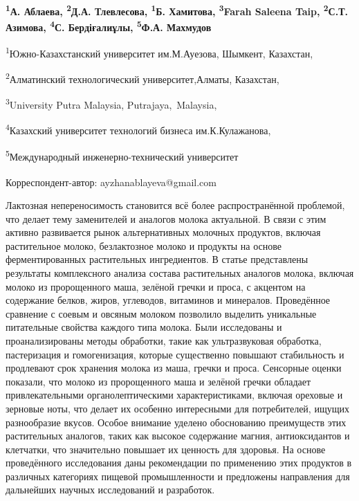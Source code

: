 
\begin{articleheader}

{\bfseries
\textsuperscript{1}А. Аблаева\textsuperscript{\envelope },
\textsuperscript{2}Д.А. Тлевлесова,
\textsuperscript{1}Б. Хамитова,
\textsuperscript{3}Farah Saleena Taip,
\textsuperscript{2}С.Т. Азимова,
\textsuperscript{4}С. Бердіғалиұлы,
\textsuperscript{5}Ф.А. Махмудов
}
\end{articleheader}

\begin{affiliation}
\textsuperscript{1}Южно-Казахстанский университет им.М.Ауезова, Шымкент, Казахстан,

\textsuperscript{2}Алматинский технологический университет,Алматы, Казахстан,

\textsuperscript{3}University Putra Malaysia, Putrajaya,~Malaysia,

\textsuperscript{4}Казахский университет технологий бизнеса им.К.Кулажанова,

\textsuperscript{5}Международный инженерно-технический университет

\raggedright \textsuperscript{\envelope }Корреспондент-автор: ayzhanablayeva@gmail.com
\end{affiliation}

Лактозная непереносимость становится всё более распространённой
проблемой, что делает тему заменителей и аналогов молока актуальной. В
связи с этим активно развивается рынок альтернативных молочных
продуктов, включая растительное молоко, безлактозное молоко и продукты
на основе ферментированных растительных ингредиентов. В статье
представлены результаты комплексного анализа состава растительных
аналогов молока, включая молоко из пророщенного маша, зелёной гречки и
проса, с акцентом на содержание белков, жиров, углеводов, витаминов и
минералов. Проведённое сравнение с соевым и овсяным молоком позволило
выделить уникальные питательные свойства каждого типа молока. Были
исследованы и проанализированы методы обработки, такие как
ультразвуковая обработка, пастеризация и гомогенизация, которые
существенно повышают стабильность и продлевают срок хранения молока из
маша, гречки и проса. Сенсорные оценки показали, что молоко из
пророщенного маша и зелёной гречки обладает привлекательными
органолептическими характеристиками, включая ореховые и зерновые ноты,
что делает их особенно интересными для потребителей, ищущих разнообразие
вкусов. Особое внимание уделено обоснованию преимуществ этих
растительных аналогов, таких как высокое содержание магния,
антиоксидантов и клетчатки, что значительно повышает их ценность для
здоровья. На основе проведённого исследования даны рекомендации по
применению этих продуктов в различных категориях пищевой промышленности
и предложены направления для дальнейших научных исследований и
разработок.

